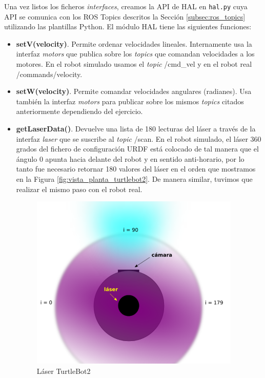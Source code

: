 Una vez listos los ficheros \textit{interfaces}, creamos la API de HAL en \texttt{hal.py} cuya API se comunica con los ROS Topics descritos la Sección \ref{subsec:ros_topics} utilizando las plantillas Python. El módulo HAL tiene las siguientes funciones:\\

\begin{itemize}
	\item \textbf{setV(velocity)}. Permite ordenar velocidades lineales. Internamente usa la interfaz \textit{motors} que publica sobre los \textit{topics} que comandan velocidades a los motores. En el robot simulado usamos el \textit{topic} /cmd\_vel y en el robot real /commands/velocity.
	\item \textbf{setW(velocity)}. Permite comandar velocidades angulares (radianes). Usa también la interfaz \textit{motors} para publicar sobre los mismos \textit{topics} citados anteriormente dependiendo del ejercicio.
	\item \textbf{getLaserData()}. Devuelve una lista de 180 lecturas del láser a través de la interfaz \textit{laser} que se suscribe al \textit{topic} /scan. En el robot simulado, el láser 360 grados del fichero de configuración URDF está colocado de tal manera que el ángulo 0 apunta hacia delante del robot y en sentido anti-horario, por lo tanto fue necesario retornar 180 valores del láser en el orden que mostramos en la Figura \ref{fig:vista_planta_turtlebot2}. De manera similar, tuvimos que realizar el mismo paso con el robot real.
\begin{figure} [H]
  \begin{center}
    \includegraphics[width=10cm]{imagenes/cap5/vista-planta-turtlebot2.png}
  \end{center}
  \caption[Láser TurtleBot2]{Láser TurtleBot2}

\end{figure}
\end{itemize}
